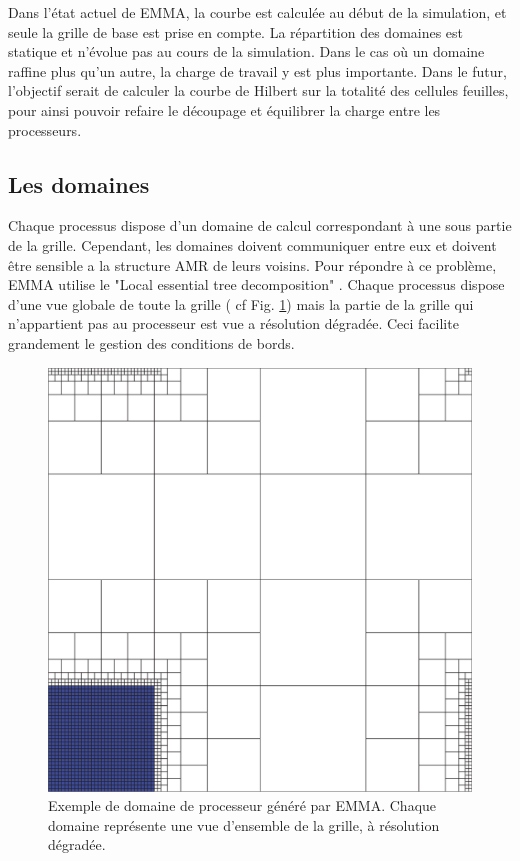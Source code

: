 %

Dans l'état actuel de EMMA, la courbe est calculée au début de la simulation, et seule la grille de base est prise en compte.
La répartition des domaines est statique et n'évolue pas au cours de la simulation.
Dans le cas où un domaine raffine plus qu'un autre, la charge de travail y est plus importante.
Dans le futur, l'objectif serait de calculer la courbe de Hilbert sur la totalité des cellules feuilles, pour ainsi pouvoir refaire le découpage et équilibrer la charge entre les processeurs.


\subsection{Les domaines}

Chaque processus dispose d'un domaine de calcul correspondant à une sous partie de la grille.
Cependant, les domaines doivent communiquer entre eux et doivent être sensible a la structure \ac{AMR} de leurs voisins.
Pour répondre à ce problème, EMMA utilise le "Local essential tree decomposition" \citep{Warren:1993:PHO:169627.169640}.
Chaque processus dispose d'une vue globale de toute la grille ( cf Fig. \ref{fig:domaine}) mais la partie de la grille qui n'appartient pas au processeur est vue a résolution dégradée.
Ceci facilite grandement le gestion des conditions de bords.

\begin{figure}
        \includegraphics[width=.95\linewidth]{img/02/secteur.png} 
        \caption[Domaine associé à un processus]{Exemple de domaine de processeur généré par EMMA. 
        Chaque domaine représente une vue d'ensemble de la grille, à résolution dégradée.
}
 		\label{fig:domaine}
\end{figure}



